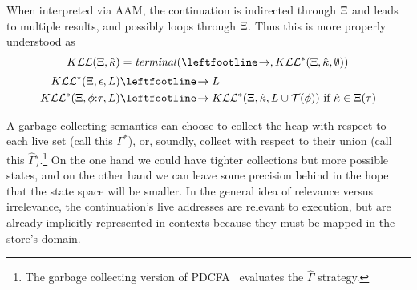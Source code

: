 When interpreted via AAM, the continuation is indirected through $\Xi$ and leads to multiple results, and possibly loops through $\Xi$.
%
Thus this is more properly understood as
\begin{align*}
  \kontlive(\mktab,\makont) &= \terminal(\stepto, \kontliveaux(\mktab,\makont,\emptyset)) \\[2pt]
  \kontliveaux(\mktab,\epsilon,L) &\stepto L \\
  \kontliveaux(\mktab,\kcons{\mkframe}{\mctx}, L) &\stepto \kontliveaux(\mktab,\makont, L\cup\touches(\mkframe)) \text{ if } \makont \in \mktab(\mctx)
\end{align*}
%

A garbage collecting semantics can choose to collect the heap with respect to each live set (call this $\Gamma^*$), or, soundly, collect with respect to their union (call this $\hat\Gamma$).\footnote{The garbage collecting version of PDCFA~\citep{ianjohnson:DBLP:journals/jfp/JohnsonSEMH14} evaluates the $\hat\Gamma$ strategy.}
%
On the one hand we could have tighter collections but more possible states, and on the other hand we can leave some precision behind in the hope that the state space will be smaller.
%
In the general idea of relevance versus irrelevance, the continuation's live addresses are relevant to execution, but are already implicitly represented in contexts because they must be mapped in the store's domain.

